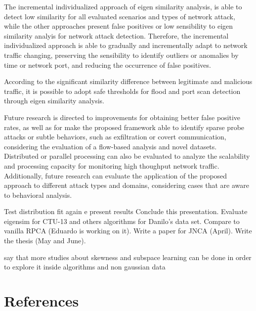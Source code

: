 \documentclass[review]{elsarticle}
\begin{document}
The incremental individualized approach of eigen similarity analysis, is able to detect low similarity for all evaluated scenarios and types of network attack, while the other approaches present false positives or low sensibility to eigen similarity analyis for network attack detection. Therefore, the incremental individualized approach is able to gradually and incrementally adapt to network traffic changing, preserving the sensibility to identify outliers or anomalies by time or network port, and reducing the occurrence of false positives.

According to the significant similarity difference between legitimate and malicious traffic, it is possible to adopt safe thresholds for flood and port scan detection through eigen similarity analysis.

Future research is directed to improvements for obtaining better false positive rates, as well as for make the proposed framework able to identify sparse probe attacks or subtle behaviors, such as exfiltration or covert communication, considering the evaluation of a flow-based analysis and novel datasets. Distributed or parallel processing can also be evaluated to analyze the scalability and processing capacity for monitoring high thoughput network traffic. Additionally, future research can evaluate the application of the proposed approach to different attack types and domains, considering cases that are aware to behavioral analysis.

Test distribution fit again e present results 
Conclude this presentation.
Evaluate eigensim for CTU-13 and others algorithms for Danilo's data set.
Compare to vanilla RPCA (Eduardo is working on it).
Write a paper for JNCA (April).
Write the thesis (May and June).

say that more studies about skewness and subspace learning can be done in order to explore it inside algorithms and non gaussian data

\section*{References}


\end{document}

